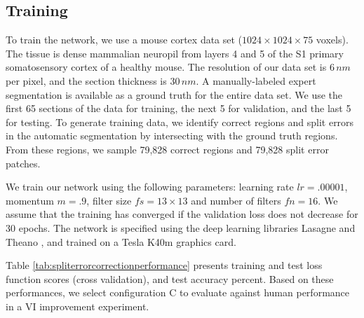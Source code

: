 \subsection{Training}
To train the network, we use a mouse cortex data set ($1024\times1024\times75$ voxels). The tissue is dense mammalian neuropil from layers 4 and 5 of the S1 primary somatosensory cortex of a healthy mouse. The resolution of our data set is $6\, nm$ per pixel, and the section thickness is $30\, nm$. 
A manually-labeled expert segmentation is available as a ground truth for the entire data set. We use the first 65 sections of the data for training, the next 5 for validation, and the last 5 for testing. To generate training data, we identify correct regions and split errors in the automatic segmentation by intersecting with the ground truth regions. From these regions, we sample 79,828 correct regions and 79,828 split error patches. 
%

We train our network using the following parameters: learning rate $lr=.00001$, momentum $m=.9$, filter size $fs=13\times13$ and number of filters $fn=16$. We assume that the training has converged if the validation loss does not decrease for 30 epochs. The network is specified using the deep learning libraries Lasagne and Theano \cite{Bastien-Theano-2012}, and trained on a Tesla K40m graphics card.

Table \ref{tab:spliterrorcorrectionperformance} presents training and test loss function scores (cross validation), and test accuracy percent. Based on these performances, we select configuration C to evaluate against human performance in a VI improvement experiment.

